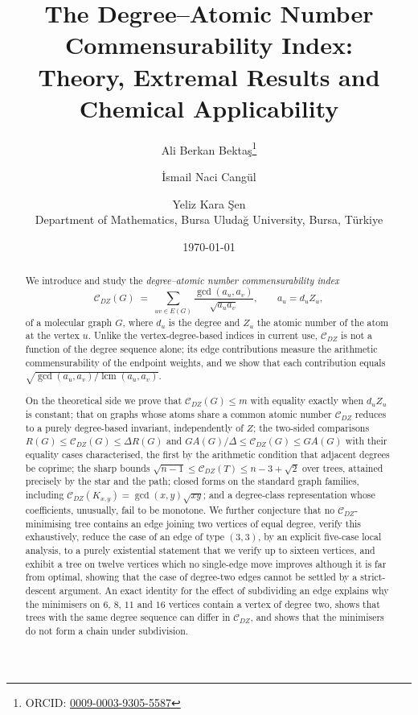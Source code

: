 \documentclass[11pt,a4paper]{article}
\title{The Degree--Atomic Number Commensurability Index:\\
Theory, Extremal Results and Chemical Applicability}
\author{Ali Berkan Bekta\c{s}\thanks{ORCID: \href{https://orcid.org/0009-0003-9305-5587}{0009-0003-9305-5587}} \and \.{I}smail Naci Cang\"ul \and Yeliz Kara \c{S}en\\[4pt]
\small Department of Mathematics, Bursa Uluda\u{g} University, Bursa, T\"urkiye}
\date{\today}
\theoremstyle{plain}
\theoremstyle{definition}
\theoremstyle{remark}
\newcommand{\CDZ}{\mathcal{C}_{DZ}}
\newcommand{\gcdd}{\operatorname{gcd}}
\newcommand{\lcmm}{\operatorname{lcm}}
\begin{document}
\maketitle

\begin{abstract}
We introduce and study the \emph{degree--atomic number commensurability index}
\[
  \CDZ(G) \;=\; \sum_{uv\in E(G)} \frac{\gcdd(a_u,a_v)}{\sqrt{a_u a_v}},
  \qquad a_u = d_u Z_u ,
\]
of a molecular graph $G$, where $d_u$ is the degree and $Z_u$ the atomic number
of the atom at the vertex $u$. Unlike the vertex-degree-based indices in current
use, $\CDZ$ is not a function of the degree sequence alone; its edge
contributions measure the arithmetic commensurability of the endpoint weights,
and we show that each contribution equals
$\sqrt{\gcdd(a_u,a_v)/\lcmm(a_u,a_v)}$.

On the theoretical side we prove that $\CDZ(G)\le m$ with equality exactly when
$d_uZ_u$ is constant; that on graphs whose atoms share a common atomic number
$\CDZ$ reduces to a purely degree-based invariant, independently of $Z$; the
two-sided comparisons $R(G)\le\CDZ(G)\le\Delta R(G)$ and
$GA(G)/\Delta\le\CDZ(G)\le GA(G)$ with their equality cases characterised, the
first by the arithmetic condition that adjacent degrees be coprime; the sharp
bounds $\sqrt{n-1}\le\CDZ(T)\le n-3+\sqrt2$ over trees, attained precisely by
the star and the path; closed forms on the standard graph families, including
$\CDZ(K_{x,y})=\gcdd(x,y)\sqrt{xy}$; and a degree-class representation whose
coefficients, unusually, fail to be monotone. We further conjecture that no
$\CDZ$-minimising tree contains an edge joining two vertices of equal degree,
verify this exhaustively, reduce the case of an edge of type $(3,3)$, by an
explicit five-case local analysis, to a purely existential statement that we
verify up to sixteen vertices, and exhibit a tree on twelve vertices which no
single-edge move improves although it is far from optimal, showing that the case
of degree-two edges cannot be settled by a strict-descent argument. An exact identity for the effect of subdividing an edge explains why
the minimisers on $6$, $8$, $11$ and $16$ vertices contain a vertex of degree
two, shows that trees with the same degree sequence can differ in $\CDZ$, and
shows that the minimisers do not form a chain under subdivision.


\end{abstract}
\end{document}
